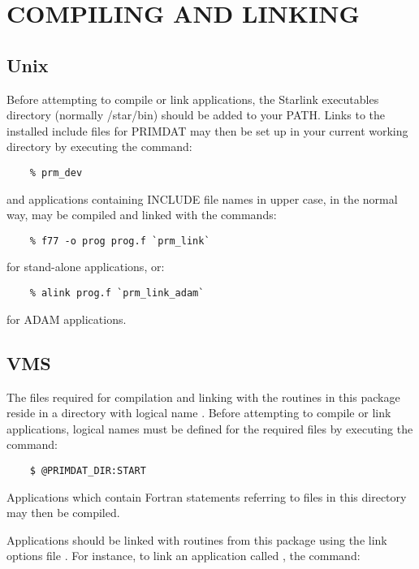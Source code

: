 \newpage
\section{COMPILING AND LINKING}

\subsection{Unix}
\label{compunix}
Before attempting to compile or link applications, the Starlink
executables directory (normally /star/bin) should be added to your PATH.
Links to the installed include files for PRIMDAT may then be set up 
in your current working directory by executing the command:

\begin{verbatim}
    % prm_dev
\end{verbatim}

and applications containing INCLUDE file names in upper case, in the normal way,
may be compiled and linked with the commands:

\begin{verbatim}
    % f77 -o prog prog.f `prm_link`
\end{verbatim}

for stand-alone applications, or:

\begin{verbatim}
    % alink prog.f `prm_link_adam`
\end{verbatim}

for ADAM applications.

\subsection{VMS}
The files required for compilation and linking with the routines in this
package reside in a directory with logical name . 
Before attempting to compile or link applications, logical names must be
defined for the required files by executing the  command:

\begin{verbatim}
    $ @PRIMDAT_DIR:START
\end{verbatim}

Applications which contain Fortran  statements referring to
files in this directory may then be compiled. 

Applications should be linked with routines from this package using the link
options file . 
For instance, to link an application called , the 
command: 

